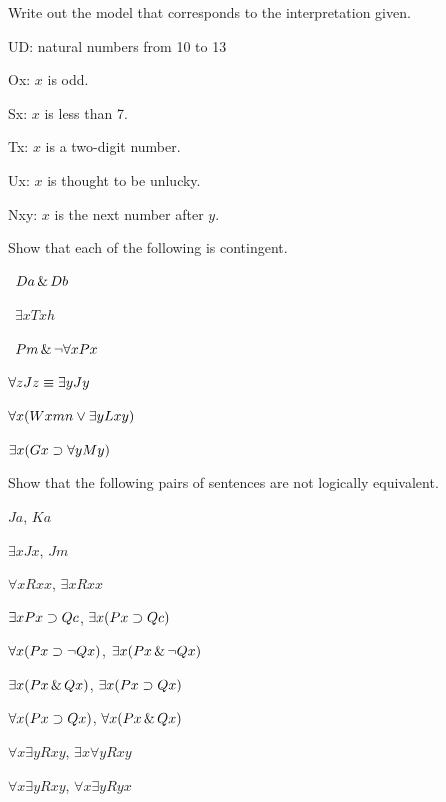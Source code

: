 \solutions
\problempart
\label{pr.InterpretationToModel}
Write out the model that corresponds to the interpretation given.
\begin{ekey}
\item{UD:} natural numbers from 10 to 13
\item{Ox:} $x$ is odd. 
\item{Sx:} $x$ is less than 7.
\item{Tx:} $x$ is a two-digit number.
\item{Ux:} $x$ is thought to be unlucky.
\item{Nxy:} $x$ is the next number after $y$.
\end{ekey}


\problempart
\label{pr.Contingent}
Show that each of the following is contingent.
\begin{earg}
\item \leftsolutions\ $Da \,\&\, Db$
\item \leftsolutions\ $\exists x Txh$
\item \leftsolutions\ $Pm \,\&\, \neg\forall x Px$
\item $\forall z Jz \equiv \exists y Jy$
\item $\forall x (Wxmn \vee \exists yLxy)$
\item $\exists x (Gx \supset \forall y My)$
\end{earg}

\solutions
\problempart
\label{pr.NotEquiv}
Show that the following pairs of sentences are not logically equivalent.
\begin{earg}
\item $Ja$, $Ka$
\item $\exists x Jx$, $Jm$
\item $\forall x Rxx$, $\exists x Rxx$
\item $\exists x Px \supset Qc$, $\exists x (Px \supset Qc)$
\item $\forall x(Px \supset \neg Qx)$, $\exists x(Px \,\&\, \neg Qx)$
\item $\exists x(Px \,\&\, Qx)$, $\exists x(Px \supset Qx)$
\item $\forall x(Px\supset Qx)$, $\forall x(Px \,\&\, Qx)$
\item $\forall x\exists y Rxy$, $\exists x\forall y Rxy$
\item $\forall x\exists y Rxy$, $\forall x\exists y Ryx$
\end{earg}



